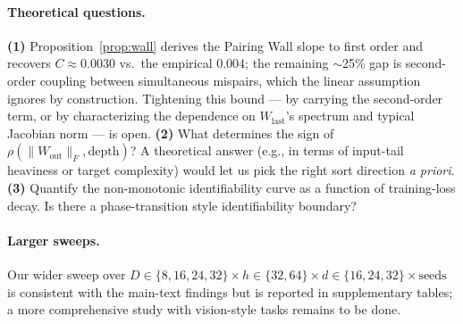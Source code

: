 \documentclass[10pt]{article}
\theoremstyle{remark}
\begin{document}
\paragraph{Theoretical questions.}
\textbf{(1)} Proposition~\ref{prop:wall} derives the Pairing Wall slope
to first order and recovers $C\approx 0.0030$ vs.\ the empirical $0.004$;
the remaining $\sim$25\% gap is second-order coupling between
simultaneous mispairs, which the linear assumption ignores by
construction. Tightening this bound --- by carrying the second-order
term, or by characterizing the dependence on
$W_{\mathrm{last}}$'s spectrum and typical Jacobian norm --- is open.
\textbf{(2)} What determines the sign of $\rho(\|W_{\mathrm{out}}\|_F, \text{depth})$?
A theoretical answer (e.g., in terms of input-tail heaviness or target
complexity) would let us pick the right sort direction \emph{a priori}.
\textbf{(3)} Quantify the non-monotonic identifiability curve as a
function of training-loss decay. Is there a phase-transition style
identifiability boundary?

\paragraph{Larger sweeps.} Our wider sweep over
$D \in \{8,16,24,32\}\times h \in \{32, 64\}\times d \in \{16,24,32\}\times \text{seeds}$
is consistent with the main-text findings but is reported in
supplementary tables; a more comprehensive study with vision-style
tasks remains to be done.
\end{document}
